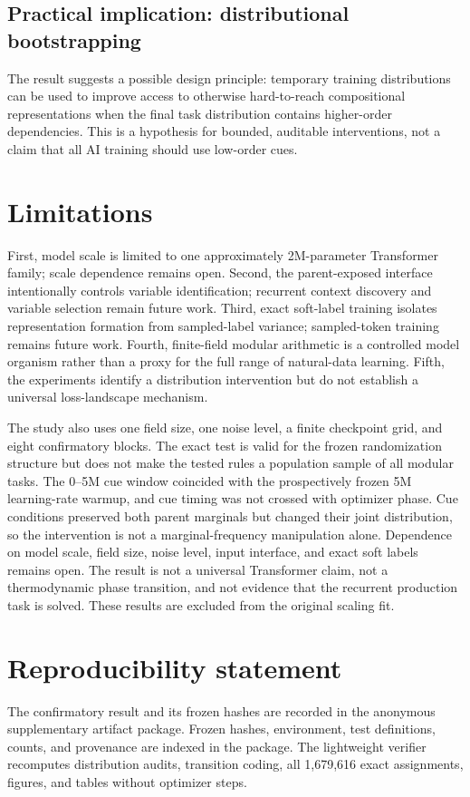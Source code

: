 \documentclass[10pt]{article}
\begin{document}
\subsection{Practical implication: distributional bootstrapping}
The result suggests a possible design principle: temporary training
distributions can be used to improve access to otherwise hard-to-reach
compositional representations when the final task distribution contains
higher-order dependencies. This is a hypothesis for bounded, auditable
interventions, not a claim that all AI training should use low-order cues.

\section{Limitations}
First, model scale is limited to one approximately 2M-parameter Transformer
family; scale dependence remains open. Second, the parent-exposed interface
intentionally controls variable identification; recurrent context discovery
and variable selection remain future work. Third, exact soft-label training
isolates representation formation from sampled-label variance; sampled-token
training remains future work. Fourth, finite-field modular arithmetic is a
controlled model organism rather than a proxy for the full range of
natural-data learning. Fifth, the experiments identify a distribution
intervention but do not establish a universal loss-landscape mechanism.

The study also uses one field size, one noise level, a finite checkpoint grid,
and eight confirmatory blocks. The exact test is valid for the frozen
randomization structure but does not make the tested rules a population sample
of all modular tasks. The 0--5M cue window coincided with the prospectively
frozen 5M learning-rate warmup, and cue timing was not crossed with optimizer
phase. Cue conditions preserved both parent marginals but changed their joint
distribution, so the intervention is not a marginal-frequency manipulation
alone. Dependence on model scale, field size, noise level, input interface, and
exact soft labels remains open. The result is not a universal Transformer
claim, not a thermodynamic phase transition, and not evidence that the
recurrent production task is solved. These results are excluded from the
original scaling fit.

\section{Reproducibility statement}
The confirmatory result and its frozen hashes are recorded in the anonymous supplementary artifact package. Frozen hashes,
environment, test definitions, counts, and provenance are indexed in the
package. The lightweight verifier recomputes distribution audits, transition
coding, all 1,679,616 exact assignments, figures,
and tables without optimizer steps.
\end{document}
